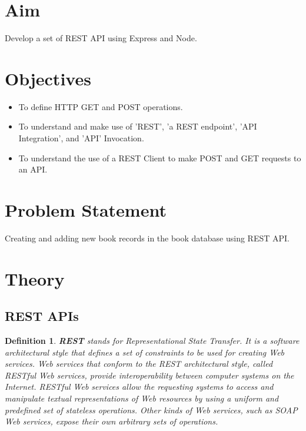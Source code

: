 \documentclass[11pt]{article}
\newtheorem{dfn}[thm]{Definition}
\begin{document}
\tableofcontents
\thispagestyle{empty}
\clearpage

\setcounter{page}{1}

\section{Aim}
Develop a set of REST API using Express and Node.

\section{Objectives}
\begin{itemize}
    \item To define HTTP GET and POST operations.
    \item To understand and make use of 'REST', 'a REST endpoint', 'API Integration', and 'API' Invocation.
    \item To understand the use of a REST Client to make POST and GET requests to an API.
\end{itemize}

\section{Problem Statement}
Creating and adding new book records in the book database using REST API.

\section{Theory}

\subsection{REST APIs}

\begin{dfn}
    \textbf{REST} stands for Representational State Transfer. It is a software architectural style that defines a set of constraints to be used for creating Web services. Web services that conform to the REST architectural style, called RESTful Web services, provide interoperability between computer systems on the Internet. RESTful Web services allow the requesting systems to access and manipulate textual representations of Web resources by using a uniform and predefined set of stateless operations. Other kinds of Web services, such as SOAP Web services, expose their own arbitrary sets of operations.
\end{dfn}
\end{document}
